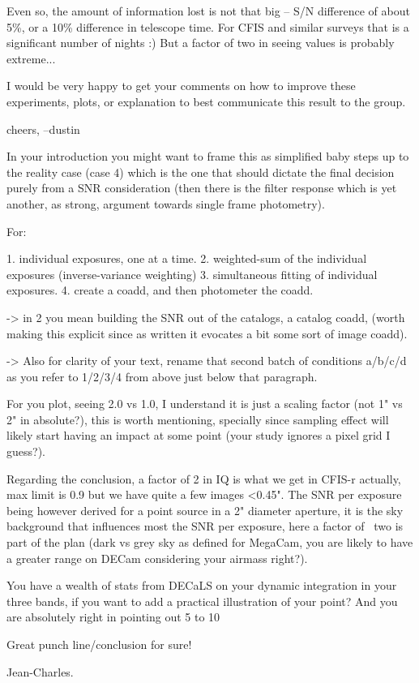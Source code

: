\documentclass[letter,11pt]{article}
\begin{document}
Even so, the amount of information lost is not that big -- S/N difference of about 5\%, or a 10\% difference in telescope time.  For CFIS and similar surveys that is a significant number of nights :)  But a factor of two in seeing values is probably extreme...


I would be very happy to get your comments on how to improve these experiments, plots, or explanation to best communicate this result to the group.

cheers,
--dustin



In your introduction you might want to frame this as simplified baby steps up to the reality case (case 4) which is the one that should dictate the final decision purely from a SNR consideration (then there is the filter response which is yet another, as strong, argument towards single frame photometry).

For:

1. individual exposures, one at a time.
2. weighted-sum of the individual exposures (inverse-variance weighting)
3. simultaneous fitting of individual exposures.
4. create a coadd, and then photometer the coadd.

-> in 2 you mean building the SNR out of the catalogs, a catalog coadd, (worth making this explicit since as written it evocates a bit some sort of image coadd).

-> Also for clarity of your text, rename that second batch of conditions a/b/c/d as you refer to 1/2/3/4 from above just below that paragraph.

For you plot, seeing 2.0 vs 1.0, I understand it is just a scaling factor (not 1" vs 2" in absolute?), this is worth mentioning, specially since sampling effect will likely start having an impact at some point (your study ignores a pixel grid I guess?).

Regarding the conclusion, a factor of 2 in IQ is what we get in CFIS-r actually, max limit is 0.9 but we have quite a few images <0.45". The SNR per exposure being however derived for a point source in a 2" diameter aperture, it is the sky background that influences most the SNR per exposure, here a factor of ~two is part of the plan (dark vs grey sky as defined for MegaCam, you are likely to have a greater range on DECam considering your airmass right?).

You have a wealth of stats from DECaLS on your dynamic integration in your three bands, if you want to add a practical illustration of your point? And you are absolutely right in pointing out 5 to 10%

Great punch line/conclusion for sure!

Jean-Charles.
\end{document}
